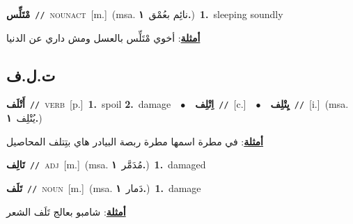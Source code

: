 \documentclass[10pt,a4paper,twoside]{article} %
\begin{document}
\begin{multicols}{2}
{\setlength\topsep{0pt}\textbf{\foreignlanguage{arabic}{مْتَلِّس}}\ {\color{gray}\texttt{//}\color{black}}\ \textsc{noun\textunderscore act}\ [m.]\ \color{gray}(msa. \foreignlanguage{arabic}{نائِم بعُمْق}~\foreignlanguage{arabic}{\textbf{١.}})\color{black}\ \textbf{1.}~sleeping soundly\  \begin{flushright}\color{gray}\foreignlanguage{arabic}{\textbf{\underline{\foreignlanguage{arabic}{أمثلة}}}: أخوي مْتَلِّس بالعسل ومش داري عن الدنيا}\end{flushright}\color{black}} \vspace{2mm}

\vspace{-3mm}
\subsection*{\color{blue}\foreignlanguage{arabic}{ت.ل.ف}\color{blue}{}} 

{\setlength\topsep{0pt}\textbf{\foreignlanguage{arabic}{أَتْلَف}}\ {\color{gray}\texttt{//}\color{black}}\ \textsc{verb}\ [p.]\ \textbf{1.}~spoil  \textbf{2.}~damage\ \ $\bullet$\ \ \setlength\topsep{0pt}\textbf{\foreignlanguage{arabic}{اِتْلِف}}\ {\color{gray}\texttt{//}\color{black}}\ [c.]\ \ $\bullet$\ \ \setlength\topsep{0pt}\textbf{\foreignlanguage{arabic}{يِتْلِف}}\ {\color{gray}\texttt{//}\color{black}}\ [i.]\ \color{gray}(msa. \foreignlanguage{arabic}{يُتْلِف}~\foreignlanguage{arabic}{\textbf{١.}})\color{black}\  \begin{flushright}\color{gray}\foreignlanguage{arabic}{\textbf{\underline{\foreignlanguage{arabic}{أمثلة}}}: في مطرة اسمها مطرة ربصة البيادر هاي بتِتلف المحاصيل}\end{flushright}\color{black}} \vspace{2mm}

{\setlength\topsep{0pt}\textbf{\foreignlanguage{arabic}{تَالِف}}\ {\color{gray}\texttt{//}\color{black}}\ \textsc{adj}\ [m.]\ \color{gray}(msa. \foreignlanguage{arabic}{مُدَمَّر}~\foreignlanguage{arabic}{\textbf{١.}})\color{black}\ \textbf{1.}~damaged\ } \vspace{2mm}

{\setlength\topsep{0pt}\textbf{\foreignlanguage{arabic}{تَلَف}}\ {\color{gray}\texttt{//}\color{black}}\ \textsc{noun}\ [m.]\ \color{gray}(msa. \foreignlanguage{arabic}{دَمار}~\foreignlanguage{arabic}{\textbf{١.}})\color{black}\ \textbf{1.}~damage\  \begin{flushright}\color{gray}\foreignlanguage{arabic}{\textbf{\underline{\foreignlanguage{arabic}{أمثلة}}}: شامبو بعالج تَلَف الشعر}\end{flushright}\color{black}} \vspace{2mm}


\end{multicols}
\end{document}
